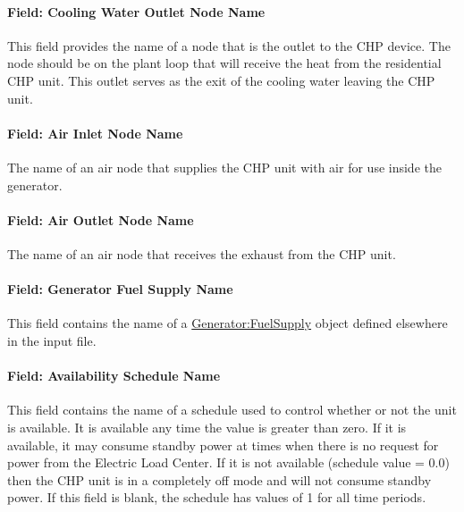 \paragraph{Field: Cooling Water Outlet Node Name}\label{field-cooling-water-outlet-node-name}

This field provides the name of a node that is the outlet to the CHP device. The node should be on the plant loop that will receive the heat from the residential CHP unit. This outlet serves as the exit of the cooling water leaving the CHP unit.

\paragraph{Field: Air Inlet Node Name}\label{field-air-inlet-node-name-000}

The name of an air node that supplies the CHP unit with air for use inside the generator.

\paragraph{Field: Air Outlet Node Name}\label{field-air-outlet-node-name-000}

The name of an air node that receives the exhaust from the CHP unit.

\paragraph{Field: Generator Fuel Supply Name}\label{field-generator-fuel-supply-name}

This field contains the name of a \hyperref[generatorfuelsupply]{Generator:FuelSupply} object defined elsewhere in the input file.

\paragraph{Field: Availability Schedule Name}\label{field-availability-schedule-name-7-000}

This field contains the name of a schedule used to control whether or not the unit is available. It is available any time the value is greater than zero. If it is available, it may consume standby power at times when there is no request for power from the Electric Load Center. If it is not available (schedule value = 0.0) then the CHP unit is in a completely off mode and will not consume standby power. If this field is blank, the schedule has values of 1 for all time periods.

